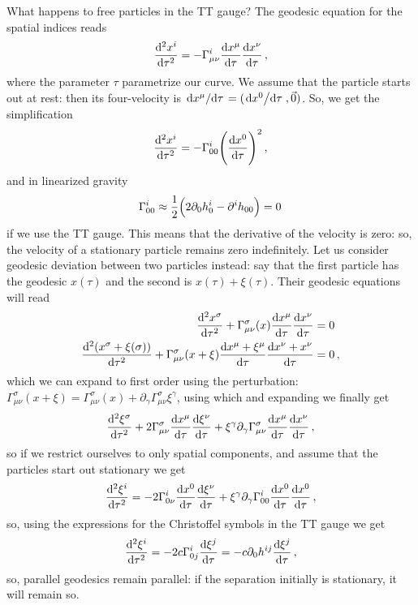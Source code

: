 \documentclass[main.tex]{subfiles}
\begin{document}
What happens to free particles in the TT gauge? The geodesic equation for the spatial indices reads 
%
\begin{align}
\dv[2]{x^{i}}{\tau} = - \Gamma^{i}_{\mu \nu } \dv{x^{\mu }}{\tau } \dv{x^{\nu }}{\tau }
\,,
\end{align}
%
where the parameter \(\tau \) parametrize our curve. 
We assume that the particle starts out at rest: then its four-velocity is \(\dv*{x^{\mu }}{\tau } = (\dv*{x^{0}}{\tau }, \vec{0})\). So, we get the simplification 
%
\begin{align}
  \dv[2]{x^{i}}{\tau} =
  - \Gamma^{i}_{00} \qty(\dv{x^{0}}{\tau })^2
\,,
\end{align}
%
and in linearized gravity  
%
\begin{align}
\Gamma^{i}_{00} \approx \frac{1}{2} \qty(2 \partial_0 h^{i}_{0} - \partial^{i} h_{00} ) =0
\,
\end{align}
%
if we use the TT gauge. 
This means that the derivative of the velocity is zero: so, the velocity of a stationary particle remains zero indefinitely. 
Let us consider geodesic deviation between two particles instead: say that the first particle has the geodesic \(x(\tau )\) and the second is \(x(\tau ) + \xi (\tau )\). Their geodesic equations will read 
%
\begin{subequations}
\begin{align}
\dv[2]{x^{\sigma }}{\tau } + \Gamma^{\sigma }_{\mu \nu } (x) \dv{x^{\mu  }}{\tau } \dv{x^{\nu }}{\tau } &= 0 \\
\dv[2]{(x^{\sigma } + \xi (\sigma )) }{\tau } + \Gamma^{\sigma }_{\mu \nu } (x + \xi ) \dv{x^{\mu  } + \xi^{\mu }}{\tau } \dv{x^{\nu } + x^{\nu }}{\tau } &= 0 
\,,
\end{align}
\end{subequations}
%
 which we can expand to first order using the perturbation: \(\Gamma^{\sigma }_{\mu \nu } (x + \xi ) = \Gamma^{\sigma }_{\mu \nu } (x) + \partial_{\gamma } \Gamma^{\sigma }_{\mu \nu } \xi^{\gamma } \), using which and expanding we finally get 
 \begin{align}
 \dv[2]{\xi^{\sigma }}{\tau } + 2 \Gamma^{\sigma}_{\mu \nu } \dv{x^{\mu }}{\tau } \dv{\xi^{\nu }}{\tau } + \xi^{\gamma } \partial_{\gamma } \Gamma^{\sigma}_{\mu \nu } \dv{x^{\mu }}{\tau } \dv{x^{\nu }}{\tau }
 \,,
 \end{align}
 so if we restrict ourselves to only spatial components, and assume that the particles start out stationary we get 
 \begin{align}
 \dv[2]{\xi ^{i}}{\tau } = - 2 \Gamma^{i}_{0 \nu } \dv{x^{0}}{\tau } \dv{\xi^{\nu }}{\tau } + \xi^{\gamma  } \partial_{\gamma } \Gamma^{i}_{00} \dv{x^{0}}{\tau }  \dv{x^{0}}{\tau }
 \,,
 \end{align}
so, using the expressions for the Christoffel symbols in the TT gauge we get 
%
\begin{align}
\dv[2]{\xi^{i}}{\tau } = - 2 c \Gamma^{i}_{0j} \dv{\xi^{j}}{\tau } = -c \partial_0  h^{ij} \dv{\xi^{j}}{\tau }
\,,
\end{align}
%
so, parallel geodesics remain parallel: if the separation initially is stationary, it will remain so. 
\end{document}
